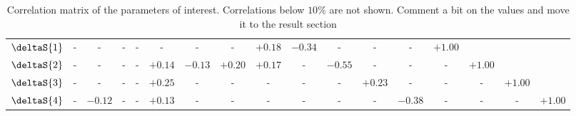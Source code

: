 \begin{sidewaystable}[p!]
\begin{center}
\begin{tabular}{ccccccccccccccccc}
$          \deltaS{1}$ &     -    &     -    &     -    &     -    &     -    &     -    &     -    &  $+0.18$ &  $-0.34$ &     -    &     -    &     -    &  $+1.00$ &  &  &  \\
$          \deltaS{2}$ &     -    &     -    &     -    &     -    &  $+0.14$ &  $-0.13$ &  $+0.20$ &  $+0.17$ &     -    &  $-0.55$ &     -    &     -    &     -    &  $+1.00$ &  &  \\
$          \deltaS{3}$ &     -    &     -    &     -    &     -    &  $+0.25$ &     -    &     -    &     -    &     -    &     -    &  $+0.23$ &     -    &     -    &     -    &  $+1.00$ &  \\
$          \deltaS{4}$ &     -    &  $-0.12$ &     -    &     -    &  $+0.13$ &     -    &     -    &     -    &     -    &     -    &     -    &  $-0.38$ &     -    &     -    &     -    &  $+1.00$ \\
\end{tabular}
\end{center}
\caption{Correlation matrix of the parameters of interest. Correlations below $10\%$ are not shown. {\color{red} Comment a bit on the values and move it to the result section} }
\label{correlation_matrix}
\end{sidewaystable}


